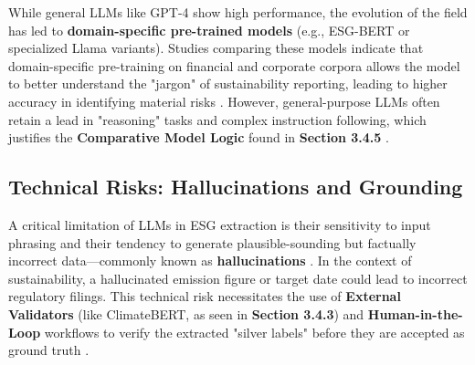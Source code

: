 While general LLMs like GPT-4 show high performance, the evolution of the field has led to \textbf{domain-specific pre-trained models} (e.g., ESG-BERT or specialized Llama variants). Studies comparing these models indicate that domain-specific pre-training on financial and corporate corpora allows the model to better understand the "jargon" of sustainability reporting, leading to higher accuracy in identifying material risks  \parencite[]{seyed_alireza_mousavian_anaraki_b56a1c0f, tae_sun_chung_e16a4c18}. However, general-purpose LLMs often retain a lead in "reasoning" tasks and complex instruction following, which justifies the \textbf{Comparative Model Logic} found in \textbf{Section 3.4.5}  \parencite[]{arash_hajikhani_cbb2528f, tae_sun_chung_e16a4c18}.
\subsection{Technical Risks: Hallucinations and Grounding}

A critical limitation of LLMs in ESG extraction is their sensitivity to input phrasing and their tendency to generate plausible-sounding but factually incorrect data—commonly known as \textbf{hallucinations}  \parencite{arash_hajikhani_cbb2528f}. In the context of sustainability, a hallucinated emission figure or target date could lead to incorrect regulatory filings. This technical risk necessitates the use of \textbf{External Validators} (like ClimateBERT, as seen in  \textbf{Section 3.4.3}) and \textbf{Human-in-the-Loop} workflows to verify the extracted "silver labels" before they are accepted as ground truth  \parencite[]{fabian_billert_a5fbb687, marco_bronzini_bf94d949, yinan_yu_e282fd98}.

